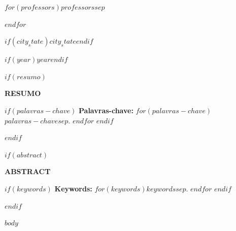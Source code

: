 \documentclass[12pt, a4paper]{article}
\begin{document}
\vspace{3cm}

$for(professors)$$professors$$sep$\par $endfor$

\vfill

\fontsize{14pt}{\baselineskip}\selectfont
\uppercase{\textbf{$if(city_state)$$city_state$$endif$}}\par
\textbf{$if(year)$$year$$endif$}
\normalsize

\newpage

\thispagestyle{empty}
\justifying
{}

$if(resumo)$
    \begin{center}{\textbf{\Large RESUMO}}\end{center}

    \noindent
    

    $if(palavras-chave)$
        \medskip
        \noindent
        \textbf{Palavras-chave: }$for(palavras-chave)$$palavras-chave$$sep$. $endfor$
    $endif$

$endif$

\newpage

\thispagestyle{empty}
$if(abstract)$
    \begin{center}{\textbf{\Large ABSTRACT}}\end{center}

    \noindent
    

    $if(keywords)$
        \medskip
        \noindent
        \textbf{Keywords: }$for(keywords)$$keywords$$sep$. $endfor$
    $endif$

$endif$

\newpage



\thispagestyle{empty}
\tableofcontents

\thispagestyle{empty}

\newpage

$body$
\end{document}
